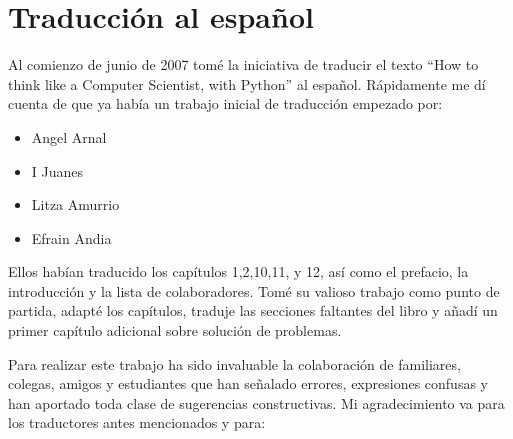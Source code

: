 


\chapter{Traducción al español}


Al comienzo de junio de 2007 tomé la iniciativa de traducir el texto 
``How to think like a Computer Scientist, with Python'' al español. Rápidamente
me dí cuenta de que ya había un trabajo inicial de traducción empezado por:

\begin{itemize}

\item Angel Arnal
\item I Juanes
\item Litza Amurrio
\item Efrain Andia

\end{itemize}

Ellos habían traducido los capítulos 1,2,10,11, y 12, así como el prefacio,
la introducción y la lista de colaboradores. Tomé su valioso trabajo como
punto de partida, adapté los capítulos, traduje las secciones faltantes 
del libro y añadí un primer capítulo adicional sobre solución de problemas.

Para realizar este trabajo ha sido invaluable la colaboración de familiares, 
colegas, amigos y estudiantes que han señalado errores, expresiones confusas y han 
aportado toda clase de sugerencias constructivas. Mi agradecimiento va para los
traductores antes mencionados y para:

